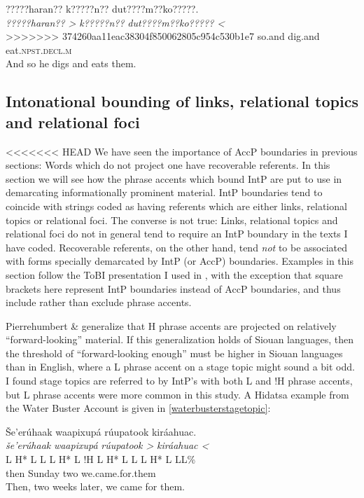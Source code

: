 \documentclass[output=paper]{LSP/langsci}
\begin{document}
\ea\label{ruetazero}
 	?????haran?? k?????n?? dut????m??ko?????.\footnotemark\\
\gll 	\emph{?????haran?? >}	\emph{k?????n??}		\emph{dut????m??ko????? <}\\
>>>>>>> 374260aa11eac38304f850062805c954c530b1e7
	so.and		dig.and		eat.\textsc{npst.decl.m}\\
\glt	And so he digs and eats them.
\z

\subsection{Intonational bounding of links, relational topics and relational foci}\label{intonationalbounding}
	
<<<<<<< HEAD
	We have seen the importance of AccP boundaries in previous sections: Words which do not project one have recoverable referents. In this section we will see how the phrase accents which bound IntP are put to use in demarcating informationally prominent material. IntP boundaries tend to coincide with strings coded as having referents which are either links, relational topics or relational foci. The converse is not true: Links, relational topics and relational foci do not in general tend to require an IntP boundary in the texts I have coded. Recoverable referents, on the other hand, tend \emph{not} to be associated with forms specially demarcated by IntP (or AccP) boundaries. Examples in this section follow the ToBI presentation I used in , with the exception that square brackets here represent IntP boundaries instead of AccP boundaries, and thus include rather than exclude phrase accents.
	
	Pierrehumbert \& \citet{Hirschberg1990} generalize that H phrase accents are projected on relatively “forward-looking” material. If this generalization holds of Siouan languages, then the threshold of “forward-looking enough” must be higher in Siouan languages than in English, where a L phrase accent on a stage topic might sound a bit odd. I found stage topics are referred to by IntP’s with both L and !H phrase accents, but L phrase accents were more common in this study. A Hidatsa example from the Water Buster Account is given in \ref{waterbusterstagetopic}:
	
\ea\label{waterbusterstagetopic}
Še’erúhaak waapixupá rúupatook kiráahuac.\footnotemark\\
\glll	\emph{še’erúhaak}		\emph{waapixupá}		\emph{rúupatook >	}	\emph{kiráahuac <}\\
	{\ob L H* L L\cb}		{\ob L H* L !H\cb}		{\ob L H* L L\cb}		{\ob L H* L L\cb{}L\%}\\
	then				Sunday			two				we.came.for.them\\
\glt	Then, two weeks later, we came for them.
\z
\end{document}
